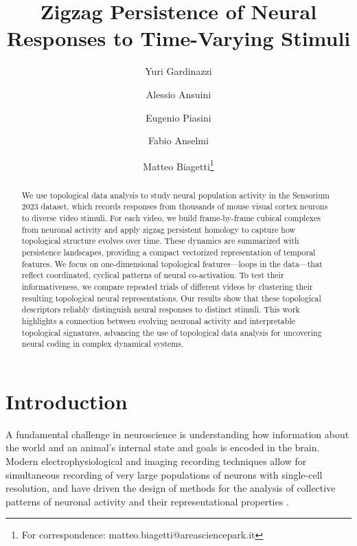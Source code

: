 \documentclass[11pt]{article}
\title{Zigzag Persistence of Neural Responses to Time-Varying Stimuli}
\author[1,2]{Yuri Gardinazzi}
\author[1]{Alessio Ansuini}
\author[3]{Eugenio Piasini}
\author[2]{Fabio Anselmi}
\author[1]{Matteo Biagetti\thanks{For correspondence: matteo.biagetti@areasciencepark.it}}
\affil[1]{Area Science Park, Padriciano 99, Trieste}
\affil[2]{Department of Mathematics, Informatics and Geosciences\\ 

University of Trieste, Via Economo 12/3, Trieste}
\affil[3]{SISSA, Via Bonomea 265, Trieste }
\date{}
\begin{document}
\maketitle

\begin{abstract}
We use topological data analysis to study neural population activity in the Sensorium 2023 dataset, which records responses from thousands of mouse visual cortex neurons to diverse video stimuli. For each video, we build frame-by-frame cubical complexes from neuronal activity and apply zigzag persistent homology to capture how topological structure evolves over time. These dynamics are summarized with persistence landscapes, providing a compact vectorized representation of temporal features. We focus on one-dimensional topological features—loops in the data—that reflect coordinated, cyclical patterns of neural co-activation. To test their informativeness, we compare repeated trials of different videos by clustering their resulting topological neural representations. Our results show that these topological descriptors reliably distinguish neural responses to distinct stimuli. This work highlights a connection between evolving neuronal activity and interpretable topological signatures, advancing the use of topological data analysis for uncovering neural coding in complex dynamical systems.
\end{abstract}





\section{Introduction}
A fundamental challenge in neuroscience is understanding how information about the world and an animal's internal state and goals is encoded in the brain. Modern electrophysiological and imaging recording techniques allow for simultaneous recording of very large populations of neurons with single-cell resolution, and have driven the design of methods for the analysis of collective patterns of neuronal activity and their representational properties \cite{saxenaNeuralPopulationDoctrine2019}.

\end{document}
